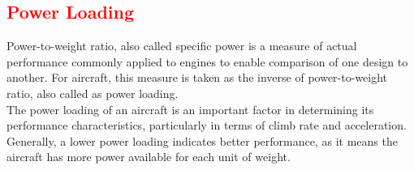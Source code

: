 \documentclass[12 pt]{article}
\begin{document}
\begin{table}[h]
\centering
{}
\caption{\textcolor{red}{Aerodynamic Data}}
\label{Aerodynamical Data}
\end{table}

\subsection{\textcolor{red}{Power Loading}}
Power-to-weight ratio, also called specific power is a measure of actual performance commonly applied to engines to enable comparison of one design to another. For aircraft, this measure is taken as the inverse of power-to-weight ratio, also called as power loading.\\
 
The power loading of an aircraft is an important factor in determining its performance characteristics, particularly in terms of climb rate and acceleration. Generally, a lower power loading indicates better performance, as it means the aircraft has more power available for each unit of weight.\\
\end{document}
